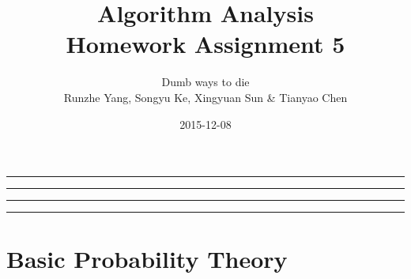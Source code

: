 \documentclass[12pt,a4]{article}
\newcounter{exercise}
\begin{document}
\date{2015-12-08}

\author{Dumb ways to die\\
Runzhe Yang, Songyu Ke, Xingyuan Sun \& Tianyao Chen}

\title{Algorithm Analysis\\
  Homework Assignment 5 \\
}
\maketitle
\hrule\hrule\hrule\hrule
\setcounter{section}{4}
\section{Basic Probability Theory}
\setcounter{subsection}{0}

\begin{exercise}
	
\end{exercise}

\begin{exercise}

\end{exercise}

\begin{exercise}
	
\end{exercise}
\end{document}
